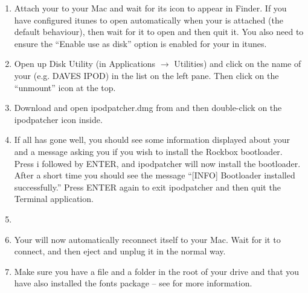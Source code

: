 \begin{enumerate}

\item Attach your \dap{} to your Mac and wait for its icon to appear in 
Finder. If you have configured itunes to open automatically when your
\dap{} is attached (the default behaviour), then wait for it to open and
then quit it. You also need to ensure the ``Enable use as disk'' option
is enabled for your \dap{} in itunes.

\item\label{subsec:macos_umount} Open up Disk Utility
(in Applications $\rightarrow$ Utilities) and click 
on the name of your \dap{} (e.g. DAVES IPOD) in the list on the left 
pane. Then click on the ``unmount'' icon at the top. 

\item Download and open ipodpatcher.dmg from 
and then double-click on the ipodpatcher icon inside. 

\item If all has gone well, you should see some 
information displayed about your \dap{} and a message asking you if you 
wish to install the Rockbox bootloader. Press i followed by ENTER, and 
ipodpatcher will now install the bootloader. After a short time you 
should see the message ``[INFO] Bootloader installed successfully.'' Press 
ENTER again to exit ipodpatcher and then quit the Terminal application.

\item {}

\item Your \dap{} will now automatically reconnect itself to your Mac. 
Wait for it to connect, and then eject and unplug it in the normal way. 

\item Make sure you have a  file and a 
 folder in the 
root of your \daps{} drive and that you have also installed the fonts
package -- see  for more information.

\end{enumerate}

